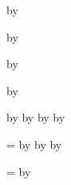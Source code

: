 \newcount\CollaboratorI
{}
\advance\CollaboratorCitations by \CollaboratorI

\newcount\CollaboratorJ
{}
\advance\CollaboratorCitations by \CollaboratorJ

\newcount\CollaboratorK
{}
\advance\CollaboratorCitations by \CollaboratorK

\newcount\CollaboratorL
{}
\advance\CollaboratorCitations by \CollaboratorL



\newcount\TotalCitations
{}

\advance\TotalCitations by \FirstAuthorCitations
\advance\TotalCitations by \StudentAuthorCitations
\advance\TotalCitations by \CoauthorCitations
\advance\TotalCitations by \CollaboratorCitations


\newcount\FirstAuthorPublications
{}

\newcount\StudentPublications
{}

\newcount\CoauthorPublications
{}

\newcount\CollaborativePublications
{}

\newcount\AllPublications
\AllPublications=\FirstAuthorPublications
\advance\AllPublications by \StudentPublications
\advance\AllPublications by \CoauthorPublications
\advance\AllPublications by \CollaborativePublications

\newcount\AllCollaborativePublications
\AllCollaborativePublications=\CoauthorPublications
\advance\AllCollaborativePublications by \CollaborativePublications
